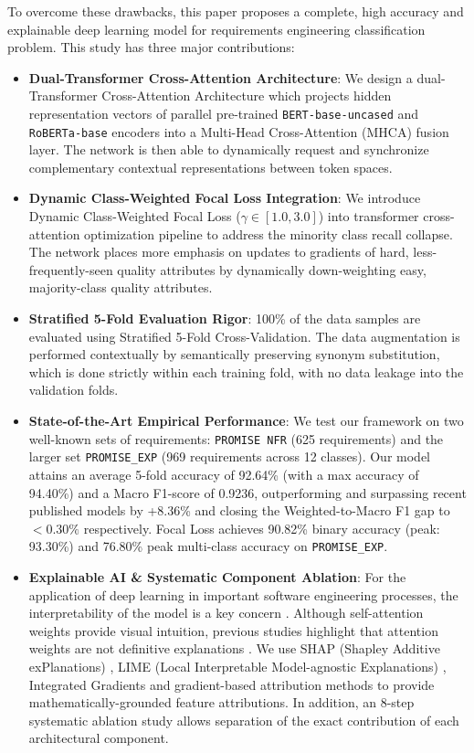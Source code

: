 \documentclass[11pt,a4paper]{article}
\begin{document}
To overcome these drawbacks, this paper proposes a complete, high accuracy and explainable deep learning model for requirements engineering classification problem. This study has three major contributions:

\begin{itemize}
    \item \textbf{Dual-Transformer Cross-Attention Architecture}: We design a dual-Transformer Cross-Attention Architecture which projects hidden representation vectors of parallel pre-trained \texttt{BERT-base-uncased} and \texttt{RoBERTa-base} encoders into a Multi-Head Cross-Attention (MHCA) fusion layer. The network is then able to dynamically request and synchronize complementary contextual representations between token spaces.
    \item \textbf{Dynamic Class-Weighted Focal Loss Integration}: We introduce Dynamic Class-Weighted Focal Loss ($\gamma \in [1.0, 3.0]$) into transformer cross-attention optimization pipeline to address the minority class recall collapse. The network places more emphasis on updates to gradients of hard, less-frequently-seen quality attributes by dynamically down-weighting easy, majority-class quality attributes.
    \item \textbf{Stratified 5-Fold Evaluation Rigor}: 100\% of the data samples are evaluated using Stratified 5-Fold Cross-Validation. The data augmentation is performed contextually by semantically preserving synonym substitution, which is done strictly within each training fold, with no data leakage into the validation folds.
    \item \textbf{State-of-the-Art Empirical Performance}: We test our framework on two well-known sets of requirements: \texttt{PROMISE NFR} (625 requirements) and the larger set \texttt{PROMISE\_EXP} (969 requirements across 12 classes). Our model attains an average 5-fold accuracy of 92.64\% (with a max accuracy of 94.40\%) and a Macro F1-score of 0.9236, outperforming and surpassing recent published models \cite{said2026intelligent} by +8.36\% and closing the Weighted-to-Macro F1 gap to $<0.30\%$ respectively. Focal Loss achieves 90.82\% binary accuracy (peak: 93.30\%) and 76.80\% peak multi-class accuracy on \texttt{PROMISE\_EXP}.
    \item \textbf{Explainable AI \& Systematic Component Ablation}: For the application of deep learning in important software engineering processes, the interpretability of the model is a key concern \cite{danilevsky2020survey, atanasova2020diagnostic}. Although self-attention weights provide visual intuition, previous studies highlight that attention weights are not definitive explanations \cite{jain2019attention, wiegreffe2019attention}. We use SHAP (Shapley Additive exPlanations) \cite{lundberg2017unified}, LIME (Local Interpretable Model-agnostic Explanations) \cite{ribeiro2016why}, Integrated Gradients \cite{sundararajan2017axiomatic} and gradient-based attribution methods \cite{selvaraju2017grad} to provide mathematically-grounded feature attributions. In addition, an 8-step systematic ablation study allows separation of the exact contribution of each architectural component.
\end{itemize}
\end{document}
